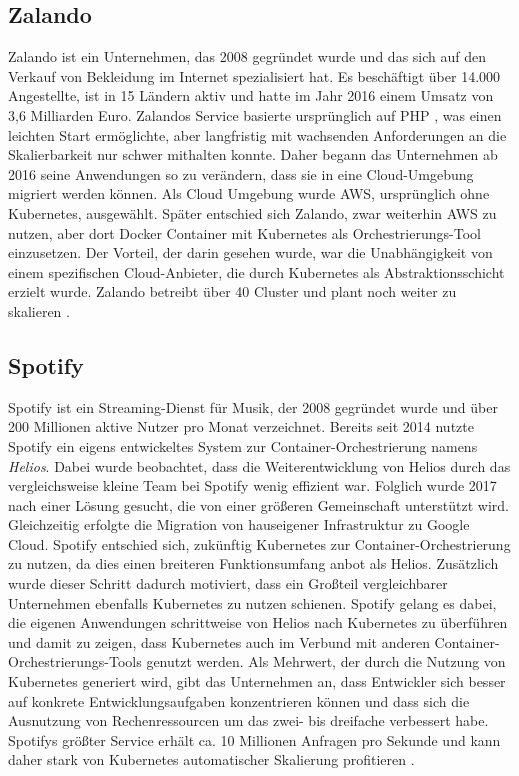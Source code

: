 \documentclass[11pt,a4paper]{article}
\begin{document}
\subsection{Zalando}
Zalando ist ein Unternehmen, das 2008 gegründet wurde und das sich auf den Verkauf
von Bekleidung im Internet spezialisiert hat. Es beschäftigt über 14.000 Angestellte,
ist in 15 Ländern aktiv und hatte im Jahr 2016 einem Umsatz von 3,6 Milliarden Euro.
Zalandos Service basierte ursprünglich auf PHP \cite{php}, was einen leichten Start ermöglichte,
aber langfristig mit wachsenden Anforderungen an die Skalierbarkeit nur schwer mithalten konnte.
Daher begann das Unternehmen ab 2016 seine Anwendungen so zu verändern, dass sie
in eine Cloud-Umgebung migriert werden können. Als Cloud Umgebung wurde AWS, %
ursprünglich ohne Kubernetes, ausgewählt. Später entschied sich Zalando,
zwar weiterhin AWS zu nutzen, aber dort Docker Container mit Kubernetes
als Orchestrierungs-Tool einzusetzen. Der Vorteil, der darin gesehen wurde,
war die Unabhängigkeit von einem spezifischen Cloud-Anbieter, die durch
Kubernetes als Abstraktionsschicht erzielt wurde.
Zalando betreibt über 40 Cluster und plant noch weiter zu skalieren \cite{story_zalando}.

\subsection{Spotify}
Spotify ist ein Streaming-Dienst für Musik, der 2008 gegründet wurde
und über 200 Millionen aktive Nutzer pro Monat verzeichnet.
Bereits seit 2014 nutzte Spotify ein eigens entwickeltes System zur Container-Orchestrierung
namens \emph{Helios}. Dabei wurde beobachtet, dass die Weiterentwicklung von Helios
durch das vergleichsweise kleine Team bei Spotify wenig effizient war.
Folglich wurde 2017 nach einer Lösung gesucht, die von einer größeren Gemeinschaft
unterstützt wird. Gleichzeitig erfolgte die Migration von hauseigener Infrastruktur
zu Google Cloud. Spotify entschied sich, zukünftig Kubernetes zur Container-Orchestrierung zu nutzen, %
da dies einen breiteren Funktionsumfang anbot als Helios.
Zusätzlich wurde dieser Schritt dadurch motiviert, dass ein Großteil
vergleichbarer Unternehmen ebenfalls Kubernetes zu nutzen schienen.
Spotify gelang es dabei, die eigenen Anwendungen schrittweise
von Helios nach Kubernetes zu überführen und damit zu zeigen, dass Kubernetes
auch im Verbund mit anderen Container-Orchestrierungs-Tools genutzt werden.
Als Mehrwert, der durch die Nutzung von Kubernetes generiert wird,
gibt das Unternehmen an, dass Entwickler sich besser auf konkrete Entwicklungsaufgaben
konzentrieren können und dass sich die Ausnutzung von Rechenressourcen
um das zwei- bis dreifache verbessert habe.
Spotifys größter Service erhält ca. 10 Millionen Anfragen pro Sekunde
und kann daher stark von Kubernetes automatischer Skalierung profitieren \cite{story_spotify}.
\end{document}
